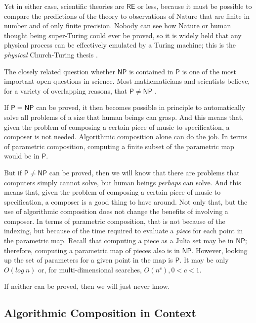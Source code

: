 \documentclass[11pt]{scrartcl}
\begin{document}
Yet in either case, scientific theories are $\mathsf{RE}$ or less, because it must be possible to compare the predictions of the theory to observations of Nature that are finite in number and of only finite precision. Nobody can see how Nature or human thought being super-Turing could ever be proved, so it is widely held that any physical process can be effectively emulated by a Turing machine; this is the \emph{physical} Church-Turing thesis \parencite{aaronson2005npcomplete, sep-church-turing}.

The closely related question whether $\mathsf{NP}$ is contained in $\mathsf{P}$ is one of the most important open questions in science. Most mathematicians and scientists believe, for a variety of overlapping reasons, that $\mathsf{P} \ne \mathsf{NP}$ .

If $\mathsf{P} = \mathsf{NP}$  can be proved, it then becomes possible in principle to automatically solve all problems of a size that human beings can grasp. And this means that, given the problem of composing a certain piece of music to specification, a composer is not needed. Algorithmic composition alone can do the job. In terms of parametric composition, computing a finite subset of the parametric map would be in $\mathsf{P}$.

But if $\mathsf{P} \ne \mathsf{NP}$ can be proved, then we will know that there are problems that computers simply cannot solve, but human beings \emph{perhaps} can solve. And this means that, given the problem of composing a certain piece of music to specification, a composer is a good thing to have around. Not only that, but the use of algorithmic composition does not change the benefits of involving a composer.  In terms of parametric composition, that is not because of the indexing, but because of the time required to evaluate a \emph{piece} for each point in the parametric map. Recall that computing a piece as a Julia set may be in $\mathsf{NP}$; therefore, computing a parametric map of pieces also is in $\mathsf{NP}$. However, looking up the set of parameters for a given point in the map is $\mathsf{P}$. It may be only $O(log\ n)$ or, for multi-dimensional searches, $O(n^{c}), 0 < c < 1$.

If neither can be proved, then we will just never know.
 
\subsection*{Algorithmic Composition in Context}
\end{document}
